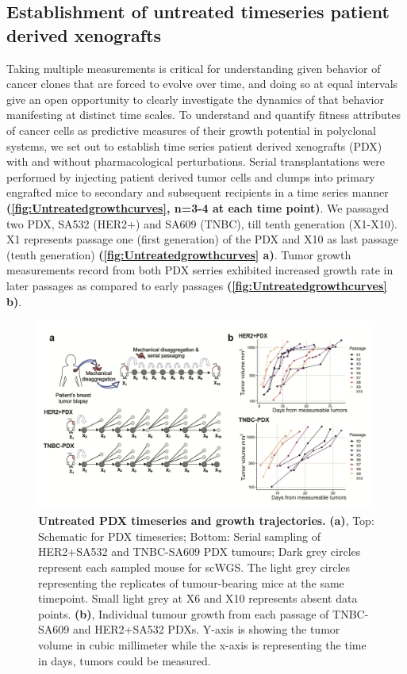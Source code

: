  
\subsection{Establishment of untreated timeseries patient derived xenografts}
Taking multiple measurements is critical for understanding  given behavior of cancer clones that are forced to evolve over time, and doing so at equal intervals give an open opportunity to clearly investigate the dynamics of that behavior manifesting at distinct time scales. 
To understand and quantify fitness attributes of cancer cells as  predictive measures of their growth potential in polyclonal systems, we set out to establish time series patient derived xenografts (PDX) with and without pharmacological perturbations.
Serial transplantations were performed by injecting patient derived tumor cells and clumps into primary engrafted mice to secondary and subsequent recipients in a time series manner \textbf{(\autoref{fig:Untreatedgrowthcurves}, n=3-4 at each time point)}. We passaged two PDX, SA532 (HER2+) and SA609 (TNBC), till tenth generation (X1-X10). X1 represents passage one (first generation) of the PDX and X10 as last passage (tenth generation)   \textbf{(\autoref{fig:Untreatedgrowthcurves} a)}. 
Tumor growth measurements record from both PDX serries exhibited increased growth rate in later passages as compared to early passages \textbf{(\autoref{fig:Untreatedgrowthcurves} b)}.
 
 \begin{figure}
\centering
\includegraphics[width=\textwidth]{Figures/chap4/Untreatedgrowthcurves.png}
	
\caption[Untreated PDX timeseries and growth trajectories]
	{\small
	\textbf{Untreated PDX timeseries and growth trajectories.}
	    \textbf{(a)}, Top: Schematic for PDX timeseries; Bottom: Serial sampling of HER2+SA532 and TNBC-SA609 PDX tumours;
Dark grey circles represent each sampled mouse for scWGS. The light grey circles representing the replicates of tumour-bearing mice at the same timepoint. Small light grey at X6 and X10 represents absent data points.
	    \textbf{(b)}, Individual tumour growth from each passage of TNBC-SA609 and HER2+SA532 PDXs. Y-axis is showing the tumor volume in cubic millimeter while the x-axis is representing the time in days, tumors could be measured.}
	\label{fig:Untreatedgrowthcurves}
\end{figure}

